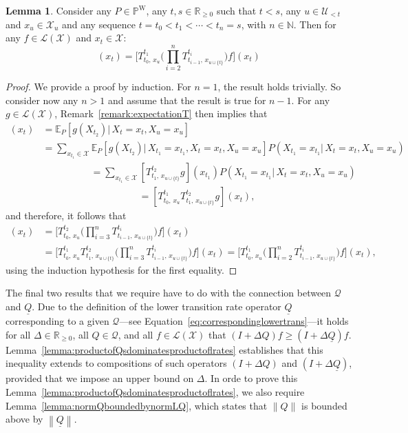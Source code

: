 \documentclass[10pt,a4paper]{paper}
\theoremstyle{definition}
\newtheorem{lemma}[theorem]{Lemma}
\newcommand{\nats}{\mathbb{N}}
\newcommand{\reals}{\mathbb{R}}
\newcommand{\realsnonneg}{\reals_{\geq 0}}
\newcommand{\states}{\mathcal{X}}
\newcommand{\processes}{\mathbb{P}}
\newcommand{\wprocesses}{\processes^{\mathrm{W}}}
\newcommand{\gambles}{\mathcal{L}}
\newcommand{\gamblesX}{\gambles(\states)}
\newcommand{\rateset}{\mathcal{Q}}
\newcommand{\lrate}{\underline{Q}}
\newcommand{\norm}[1]{\left\lVert #1 \right\rVert}
\begin{document}
\begin{lemma}\label{lemma:weirddecomposition}
Consider any $P\in\wprocesses$, any $t,s\in\realsnonneg$ such that $t<s$, any $u\in\mathcal{U}_{<t}$ and $x_u\in\states_u$ and any sequence $t=t_0<t_1<\cdots<t_n=s$, with $n\in\nats$.
Then for any $f\in\gamblesX$ and $x_t\in\states$:
\begin{equation*}
[T_{t,\,x_u}^sf](x_t)
=\Big[T_{t_0,\,x_u}^{t_1}\Bigg(\prod_{i=2}^{n}T_{t_{i-1},\,x_{u\cup\{t\}}}^{t_{i}}\Bigg)f\Big](x_t)
\end{equation*}
\end{lemma}
\begin{proof}
We provide a proof by induction. For $n=1$, the result holds trivially. So consider now any $n>1$ and assume that the result is true for $n-1$.
For any $g\in\gamblesX$, Remark~\ref{remark:expectationT} then implies that
\begin{align*}
[T_{t_0,\,x_u}^{t_2}g](x_t)
&=\mathbb{E}_P[g(X_{t_2})\vert\,X_{t}=x_t,X_u=x_u]\\
&=\sum_{x_{t_1}\in\states}\mathbb{E}_P[g(X_{t_2})\vert\,X_{t_1}=x_{t_1},X_{t}=x_t,X_u=x_u]P(X_{t_1}=x_{t_1}\vert\,X_{t}=x_t,X_u=x_u)\\[-8pt]
&\quad\quad\quad\quad\quad=\sum_{x_{t_1}\in\states}
[T_{t_1,\,x_{u\cup\{t\}}}^{t_{2}}g](x_{t_1})P(X_{t_1}=x_{t_1}\vert\,X_{t}=x_t,X_u=x_u)\\[-6pt]
&\quad\quad\quad\quad\quad\quad\quad\quad\quad\quad=[T_{t_0,\,x_u}^{t_1}
T_{t_1,\,x_{u\cup\{t\}}}^{t_{2}}g](x_t),
\end{align*}
and therefore, it follows that
\begin{align*}
[T_{t,\,x_u}^sf](x_t)
&=\Big[T_{t_0,\,x_u}^{t_2}\Bigg(\prod_{i=3}^{n}T_{t_{i-1},\,x_{u\cup\{t\}}}^{t_{i}}\Bigg)f\Big](x_t)
\\
 &= \Big[T_{t_0,\,x_u}^{t_1}
T_{t_1,\,x_{u\cup\{t\}}}^{t_{2}}
\Bigg(\prod_{i=3}^{n}T_{t_{i-1},\,x_{u\cup\{t\}}}^{t_{i}}\Bigg)f\Big](x_t) =\Big[T_{t_0,\,x_u}^{t_1}\Bigg(\prod_{i=2}^{n}T_{t_{i-1},\,x_{u\cup\{t\}}}^{t_{i}}\Bigg)f\Big](x_t),
\end{align*}
using the induction hypothesis for the first equality.
\end{proof}

The final two results that we require have to do with the connection between $\rateset$ and $\lrate$. Due to the definition of the lower transition rate operator $\lrate$ corresponding to a given $\rateset$---see Equation~\eqref{eq:correspondinglowertrans}---it holds for all $\Delta\in\realsnonneg$, all $Q\in\rateset$, and all $f\in\gamblesX$ that $(I+\Delta Q)f \geq (I+\Delta\lrate)f$. Lemma~\ref{lemma:productofQsdominatesproductoflrates} establishes that this inequality extends to compositions of such operators $(I+\Delta Q)$ and $(I+\Delta\lrate)$, provided that we impose an upper bound on $\Delta$. In orde to prove this Lemma~\ref{lemma:productofQsdominatesproductoflrates}, we also require Lemma~\ref{lemma:normQboundedbynormLQ}, which states that $\norm{Q}$ is bounded above by $\norm{\lrate}$.
\end{document}

